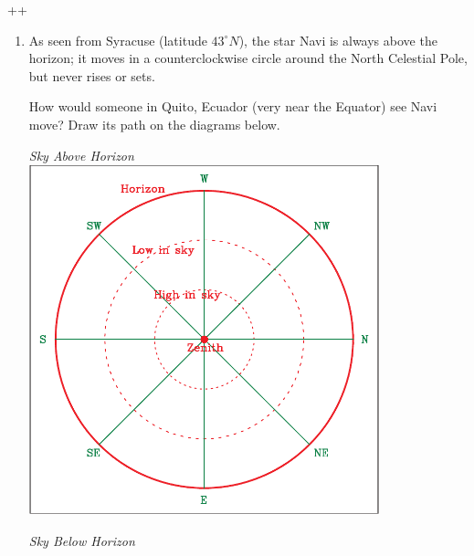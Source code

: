 ++\documentclass[12pt]{article}
\begin{document}
\begin{enumerate}
\begin{center}
\begin{minipage}{0.4\textwidth}
\begin{center}
				\end{center}
			\end{minipage}
		\end{center}
		
		
		\vspace{1.5in}
		
		\item As seen from Syracuse (latitude $43^\circ N$), the star Navi is always above the horizon; it moves in a counterclockwise circle around the North Celestial Pole, but never rises or sets.
		
		How would someone in Quito, Ecuador (very near the Equator) see Navi move? Draw its path on the diagrams below. 
		
						\begin{center}
			\begin{minipage}{0.4\textwidth}
				\begin{center}
					\it Sky Above Horizon\\
					\includegraphics[width=0.8\textwidth]{topsky-crop.pdf}
				\end{center}
			\end{minipage}
			\begin{minipage}{0.4\textwidth}
				\begin{center}
					\it Sky Below Horizon\\

\end{center}
\end{minipage}
\end{center}
\end{enumerate}
\end{document}
